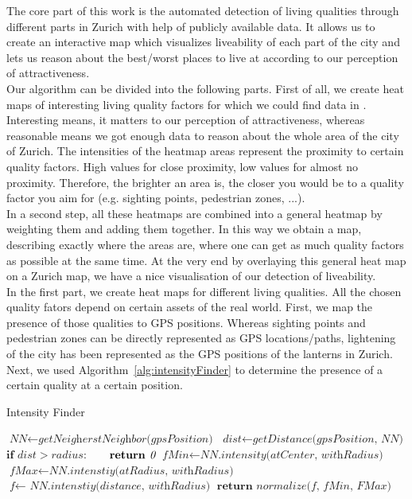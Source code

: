 \documentclass[letterpaper]{article}
\begin{document}
The core part of this work is the automated detection of living qualities through different parts in Zurich with help of publicly available data. It allows us to create an interactive map which visualizes liveability of each part of the city and lets us reason about the best/worst places to live at according to our perception of attractiveness.
\\
\indent Our algorithm can be divided into the following parts. First of all, we create heat maps of interesting living quality factors for which we could find data in \cite{ZurichOD}. Interesting means, it matters to our perception of attractiveness, whereas reasonable means we got enough data to reason about the whole area of the city of Zurich. The intensities of the heatmap areas represent the proximity to certain quality factors. High values for close proximity, low values for almost no proximity. Therefore, the brighter an area is, the closer you would be to a quality factor you aim for (e.g. sighting points, pedestrian zones, ...).\\
\indent In a second step, all these heatmaps are combined into a general heatmap by weighting them and adding them together. In this way we obtain a map, describing exactly where the areas are, where one can get as much quality factors as possible at the same time.
At the very end by overlaying this general heat map on a Zurich map, we have a nice visualisation of our detection of liveability.
\\
\indent In the first part, we create heat maps for different living qualities. All the chosen quality fators depend on certain assets of the real world. First, we map the presence of those qualities to GPS positions. Whereas sighting points and pedestrian zones can be directly represented as GPS locations/paths, lightening of the city has been represented as the GPS positions of the lanterns in Zurich. Next, we used Algorithm~\ref{alg:intensityFinder} to determine the presence of a certain quality at a certain position.
\begin{algorithm}
    \caption{Intensity Finder}\label{alg:intensityFinder}
    \begin{algorithmic}[1]
            \State $\textit{NN} \gets \textit{getNeigherstNeighbor(gpsPosition)}$
            \State $\textit{dist} \gets \textit{getDistance(gpsPosition, NN)}$
            \State $\textbf{if } \textit{dist} > radius:$
            \State $\indent \textbf{return } \textit{0}$
			 \State $\textit{fMin} \gets \textit{NN.intensity(atCenter, withRadius)}$
			 \State $\textit{fMax} \gets \textit{NN.intenstiy(atRadius, withRadius)}$
			 \State $\textit{f} \gets \textit{ NN.intenstiy(distance, withRadius)}$
			 \State $\textbf{return } \textit{normalize(f, fMin, FMax)}$
        \EndProcedure
    \end{algorithmic}
\end{algorithm}
\end{document}
